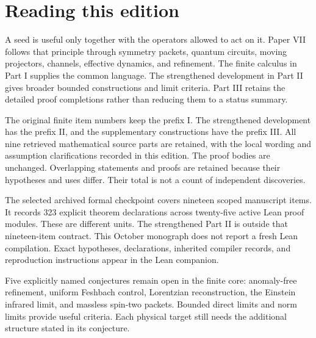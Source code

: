 \documentclass[11pt,letterpaper]{article}
\theoremstyle{definition}
\theoremstyle{remark}
\begin{document}
\KomorebiCover
{}

\section*{Reading this edition}
A seed is useful only together with the operators allowed to act on it. Paper VII follows that principle through symmetry packets, quantum circuits, moving projectors, channels, effective dynamics, and refinement. The finite calculus in Part I supplies the common language. The strengthened development in Part II gives broader bounded constructions and limit criteria. Part III retains the detailed proof completions rather than reducing them to a status summary.

The original finite item numbers keep the prefix I. The strengthened development has the prefix II, and the supplementary constructions have the prefix III. All nine retrieved mathematical source parts are retained, with the local wording and assumption clarifications recorded in this edition. The proof bodies are unchanged. Overlapping statements and proofs are retained because their hypotheses and uses differ. Their total is not a count of independent discoveries.

The selected archived formal checkpoint covers nineteen scoped manuscript items. It records 323 explicit theorem declarations across twenty-five active Lean proof modules. These are different units. The strengthened Part II is outside that nineteen-item contract. This October monograph does not report a fresh Lean compilation. Exact hypotheses, declarations, inherited compiler records, and reproduction instructions appear in the Lean companion.

Five explicitly named conjectures remain open in the finite core: anomaly-free refinement, uniform Feshbach control, Lorentzian reconstruction, the Einstein infrared limit, and massless spin-two packets. Bounded direct limits and norm limits provide useful criteria. Each physical target still needs the additional structure stated in its conjecture.
\end{document}
